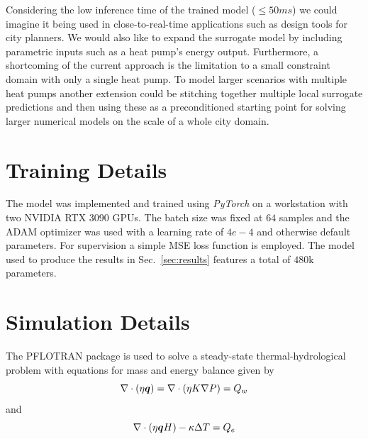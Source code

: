 \documentclass{article} %
\begin{document}
Considering the low inference time of the trained model ($\leq 50ms$) we could imagine it being used in close-to-real-time applications such as design tools for city planners.
We would also like to expand the surrogate model by including parametric inputs such as a heat pump's energy output.
Furthermore, a shortcoming of the current approach is the limitation to a small constraint domain with only a single heat pump.
To model larger scenarios with multiple heat pumps another extension could be stitching together multiple local surrogate predictions and then using these as a preconditioned starting point for solving larger numerical models on the scale of a whole city domain.


% 




\appendix

\section{Training Details}
\label{ap:training_details}
The model was implemented and trained using \emph{PyTorch} \citep{pytorch} on a workstation with two NVIDIA RTX 3090 GPUs. The batch size was fixed at $64$ samples and the ADAM optimizer was used with a learning rate of $4e-4$ and otherwise default parameters.
For supervision a simple MSE loss function is employed.
The model used to produce the results in Sec.~\ref{sec:results} features a total of $480$k parameters.


\section{Simulation Details}
\label{ap:sim_details}
The PFLOTRAN \citep{pflotran-paper} package is used to solve a steady-state thermal-hydrological problem with equations for mass and energy balance given by
\begin{equation}
   \label{eq:mass}
   \nabla \cdot \left(\eta {\bm{q}} \right) =  \nabla \cdot \left(\eta  K \nabla P  \right) = Q_w
\end{equation}
and
\begin{equation}
   \label{eq:energy}
   \nabla \cdot \left(\eta {\bm{q}} H\right) - \kappa \Delta T = Q_e
\end{equation}
\end{document}
